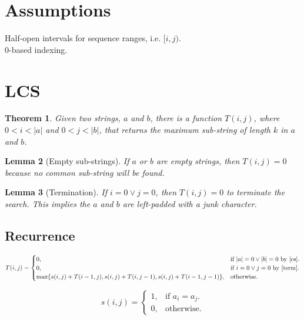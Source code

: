 \documentclass{article}
\newtheorem{theorem}{Theorem}[section]
\newtheorem{lemma}[theorem]{Lemma}
\begin{document}
	\section{Assumptions}
	Half-open intervals for sequence ranges, i.e. $[i,j)$.\\
	0-based indexing.
	
	\section{LCS}
	\begin{theorem}
	Given two strings, $a$ and $b$, there is a function $T(i, j)$, where $0 < i < |a|$ and $0 < j < |b|$, that returns the 
	maximum sub-string of length $k$ in $a$ and $b$.
	\end{theorem}
	
	\begin{lemma} [Empty sub-strings]
	\label{cs}	
	If $a$ or $b$ are empty strings, then $T(i,j)=0$ because no common sub-string will be found.
	\end{lemma}
	
	\begin{lemma} [Termination]
	\label{term}	
	If $i=0 \vee j=0$, then $T(i,j)=0$ to terminate the search. This implies the $a$ and $b$ are left-padded with a junk character.
	\end{lemma}
	
	\subsection{Recurrence}
	 \begin{equation}
	T(i, j)=			
	\begin{cases}
	0, & \text{if $|a|=0 \vee |b|=0$ by \ref{cs}}.\\
	0, & \text{if $i=0 \vee j=0$ by \ref{term}}.\\	
	\text{max}\{s(i,j)+T(i-1,j), s(i,j)+T(i,j-1), s(i,j)+T(i-1,j-1)\}, & \text{otherwise.}				
	\end{cases}
	\end{equation}
	
	\begin{equation}
	s(i,j)=
	\begin{cases}
	1, & \text{if } a_i = a_j.\\
	0, & \text{otherwise.}
	\end{cases}
	\end{equation}
	
\end{document}
